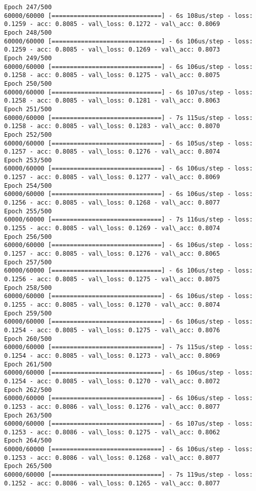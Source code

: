 \documentclass[11pt]{article}
\begin{document}
\begin{Verbatim}[commandchars=\\\{\}]
Epoch 247/500
60000/60000 [==============================] - 6s 108us/step - loss: 0.1259 - acc: 0.8085 - val\_loss: 0.1272 - val\_acc: 0.8069
Epoch 248/500
60000/60000 [==============================] - 6s 106us/step - loss: 0.1259 - acc: 0.8085 - val\_loss: 0.1269 - val\_acc: 0.8073
Epoch 249/500
60000/60000 [==============================] - 6s 106us/step - loss: 0.1258 - acc: 0.8085 - val\_loss: 0.1275 - val\_acc: 0.8075
Epoch 250/500
60000/60000 [==============================] - 6s 107us/step - loss: 0.1258 - acc: 0.8085 - val\_loss: 0.1281 - val\_acc: 0.8063
Epoch 251/500
60000/60000 [==============================] - 7s 115us/step - loss: 0.1258 - acc: 0.8085 - val\_loss: 0.1283 - val\_acc: 0.8070
Epoch 252/500
60000/60000 [==============================] - 6s 105us/step - loss: 0.1257 - acc: 0.8085 - val\_loss: 0.1276 - val\_acc: 0.8074
Epoch 253/500
60000/60000 [==============================] - 6s 106us/step - loss: 0.1257 - acc: 0.8085 - val\_loss: 0.1277 - val\_acc: 0.8069
Epoch 254/500
60000/60000 [==============================] - 6s 106us/step - loss: 0.1256 - acc: 0.8085 - val\_loss: 0.1268 - val\_acc: 0.8077
Epoch 255/500
60000/60000 [==============================] - 7s 116us/step - loss: 0.1255 - acc: 0.8085 - val\_loss: 0.1269 - val\_acc: 0.8074
Epoch 256/500
60000/60000 [==============================] - 6s 106us/step - loss: 0.1257 - acc: 0.8085 - val\_loss: 0.1276 - val\_acc: 0.8065
Epoch 257/500
60000/60000 [==============================] - 6s 106us/step - loss: 0.1256 - acc: 0.8085 - val\_loss: 0.1275 - val\_acc: 0.8075
Epoch 258/500
60000/60000 [==============================] - 6s 106us/step - loss: 0.1255 - acc: 0.8085 - val\_loss: 0.1270 - val\_acc: 0.8074
Epoch 259/500
60000/60000 [==============================] - 6s 106us/step - loss: 0.1254 - acc: 0.8085 - val\_loss: 0.1275 - val\_acc: 0.8076
Epoch 260/500
60000/60000 [==============================] - 7s 115us/step - loss: 0.1254 - acc: 0.8085 - val\_loss: 0.1273 - val\_acc: 0.8069
Epoch 261/500
60000/60000 [==============================] - 6s 106us/step - loss: 0.1254 - acc: 0.8085 - val\_loss: 0.1270 - val\_acc: 0.8072
Epoch 262/500
60000/60000 [==============================] - 6s 106us/step - loss: 0.1253 - acc: 0.8086 - val\_loss: 0.1276 - val\_acc: 0.8077
Epoch 263/500
60000/60000 [==============================] - 6s 107us/step - loss: 0.1253 - acc: 0.8086 - val\_loss: 0.1275 - val\_acc: 0.8062
Epoch 264/500
60000/60000 [==============================] - 6s 106us/step - loss: 0.1253 - acc: 0.8086 - val\_loss: 0.1268 - val\_acc: 0.8077
Epoch 265/500
60000/60000 [==============================] - 7s 119us/step - loss: 0.1252 - acc: 0.8086 - val\_loss: 0.1265 - val\_acc: 0.8077

\end{Verbatim}
\end{document}
